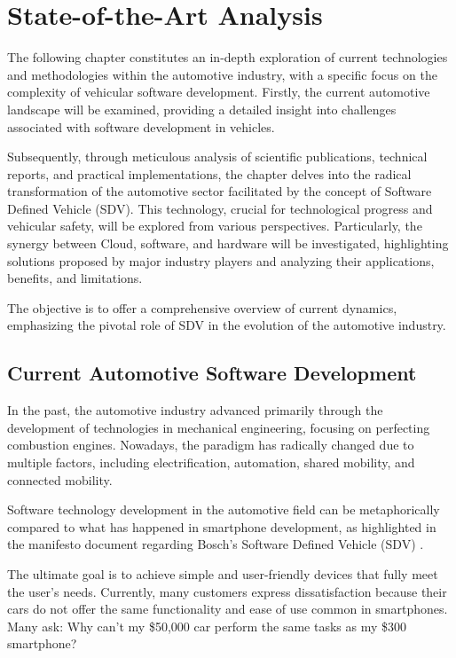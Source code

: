 
\chapter{State-of-the-Art Analysis} \label{ch:state-of-the-ArtAnalysis}
The following chapter constitutes an in-depth exploration of current technologies and methodologies within the automotive industry, with a specific focus on the complexity of vehicular software development. Firstly, the current automotive landscape will be examined, providing a detailed insight into challenges associated with software development in vehicles.

Subsequently, through meticulous analysis of scientific publications, technical reports, and practical implementations, the chapter delves into the radical transformation of the automotive sector facilitated by the concept of Software Defined Vehicle (SDV). This technology, crucial for technological progress and vehicular safety, will be explored from various perspectives. Particularly, the synergy between Cloud, software, and hardware will be investigated, highlighting solutions proposed by major industry players and analyzing their applications, benefits, and limitations.

The objective is to offer a comprehensive overview of current dynamics, emphasizing the pivotal role of SDV in the evolution of the automotive industry.

\section{Current Automotive Software Development}

In the past, the automotive industry advanced primarily through the development of technologies in mechanical engineering, focusing on perfecting combustion engines. Nowadays, the paradigm has radically changed due to multiple factors, including electrification, automation, shared mobility, and connected mobility.

Software technology development in the automotive field can be metaphorically compared to what has happened in smartphone development, as highlighted in the manifesto document regarding Bosch's Software Defined Vehicle (SDV) \cite{SDVBoschMobility}.

The ultimate goal is to achieve simple and user-friendly devices that fully meet the user's needs. Currently, many customers express dissatisfaction because their cars do not offer the same functionality and ease of use common in smartphones. Many ask: Why can't my \$50,000 car perform the same tasks as my \$300 smartphone?

